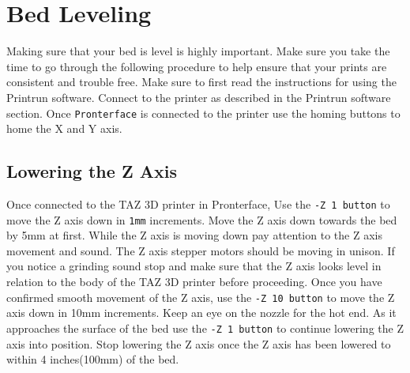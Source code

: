 \section{Bed Leveling}
Making sure that your bed is level is highly important. Make sure you take the time to go through the following procedure to help ensure that your prints are consistent and trouble free. Make sure to first read the instructions for using the Printrun software. Connect to the printer as described in the Printrun software section. Once \texttt{Pronterface} is connected to the printer use the homing buttons to home the X and Y axis. 

\subsection{Lowering the Z Axis}
Once connected to the TAZ 3D printer in Pronterface, Use the \texttt{-Z 1 button} to move the Z axis down in \texttt{1mm} increments. Move the Z axis down towards the bed by 5mm at first. While the Z axis is moving down pay attention to the Z axis movement and sound. The Z axis stepper motors should be moving in unison. If you notice a grinding sound stop and make sure that the Z axis looks level in relation to the body of the TAZ 3D printer before proceeding. Once you have confirmed smooth movement of the Z axis, use the \texttt{-Z 10 button} to move the Z axis down in 10mm increments. \color{red}{Commands sent in Pronterface will stack, so multiple movement button presses can potentially be harmful and cannot be stopped without powering down the 3D printer.} Keep an eye on the nozzle for the hot end. As it approaches the surface of the bed use the \texttt{-Z 1 button} to continue lowering the Z axis into position. Stop lowering the Z axis once the Z axis has been lowered to within 4 inches(100mm) of the bed.

